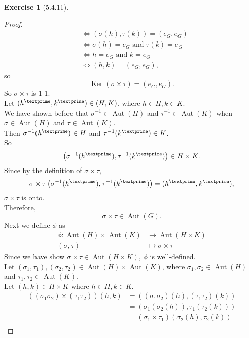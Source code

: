 \documentclass{amsart}
\renewcommand{\ker}{\operatorname{Ker}}
\theoremstyle{plain}
\theoremstyle{definition}
\newtheorem{exer}[lem]{Exercise}
\begin{document}
\begin{exer}[5.4.11]
\begin{proof}
\begin{align*}
	  									 & \Leftrightarrow  (\sigma (h), \tau (k)) = (e_G,e_G) \\
	  									 & \Leftrightarrow  \sigma (h) = e_G \text{ and }\tau( k) = e_G \\
	  									 & \Leftrightarrow  h = e_G \text{ and } k = e_G \\
	  									 & \Leftrightarrow (h,k) = (e_G,e_G),
	\end{align*}
   so 
   \[\ker(\sigma \times \tau) = (e_G,e_G).\]
   So $\sigma \times \tau$ is 1-1.\\
   Let $(h^{\textprime},k^{\textprime}) \in (H,K)$, where $h \in H, k \in K$.\\
   We have shown before that $\sigma^{-1} \in \operatorname{Aut}(H)$ and $\tau^{-1} \in \operatorname{Aut}(K)$ when $\sigma \in \operatorname{Aut}(H)$ and $\tau \in \operatorname{Aut}(K)$.\\
   Then $\sigma^{-1}(h^{\textprime}) \in H$ and $\tau^{-1}(k^{\textprime}) \in K$.\\
   So 
   \[\left(\sigma^{-1}(h^{\textprime}),\tau^{-1}(k^{\textprime})\right) \in H \times K.\]
   Since by the definition of $\sigma \times \tau$, 
   \[\sigma \times \tau \left(\sigma^{-1}(h^{\textprime}), \tau^{-1}(k^{\textprime}) \right) = (h^{\textprime},k^{\textprime}),\]
   $\sigma \times \tau$ is onto.\\
   Therefore, 
   \[\sigma \times \tau \in \operatorname{Aut}(G).\] 
   Next we define $\phi$ as 
   \begin{align*}
	 \phi: \operatorname{Aut}(H) \times \operatorname{Aut}(K) &\to \operatorname{Aut}(H \times K) \\
	 					(\sigma, \tau) &\mapsto \sigma \times \tau
   \end{align*}
   Since we have show $\sigma \times \tau \in \operatorname{Aut}(H \times K)$, $\phi$ is well-defined.\\
   Let $(\sigma_1,\tau_1),(\sigma_2,\tau_2) \in \operatorname{Aut}(H) \times \operatorname{Aut}(K)$, where $\sigma_1,\sigma_2 \in \operatorname{Aut}(H)$ and $\tau_1,\tau_2 \in \operatorname{Aut}(K)$.\\
   Let $(h,k) \in H \times K$ where $h \in H, k \in K$.
   \begin{align*}
	 \left((\sigma_1\sigma_2) \times (\tau_1\tau_2)\right)(h,k) &= \left((\sigma_1\sigma_2)(h), (\tau_1\tau_2)(k) \right)\\	
	 							  								&=(\sigma_1(\sigma_2(h)), \tau_1(\tau_2(k)))\\
	 												  &=(\sigma_1 \times \tau_1)(\sigma_2(h),\tau_2(k))\\

\end{align*}
\end{proof}
\end{exer}
\end{document}
